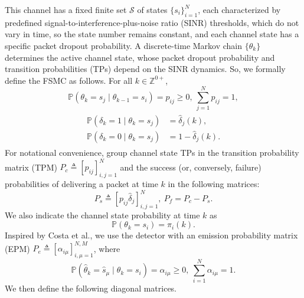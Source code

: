 \documentclass[journal,twoside,web]{ieeecolor}
\begin{document}
This channel has a fixed finite set $\mathcal{S}$ of states $\{s_i\}_{i=1}^{N}$, each characterized by predefined signal-to-interference-plus-noise ratio (SINR) thresholds, which do not vary in time, so the state number remains constant, and each channel state has a specific packet dropout probability. 
A discrete-time Markov chain $\{\theta_k\}$ determines the active channel state, whose packet dropout probability and transition probabilities (TPs) depend on the SINR dynamics. So, we formally define the FSMC as follows.
For all $k\in \mathbb{Z}^{0+}$,
\begin{equation}\label{eq:p-ij}
    \mathbb{P}(\theta_{k} = s_j \mid \theta_{k-1} = s_i) = p_{ij} \geq 0,~ \sum_{j=1}^N p_{ij} = 1,
\end{equation}
\begin{align}\label{eq:p-delta}
\begin{aligned}
    \mathbb{P}(\delta_k = 1 \mid \theta_{k} = s_j) &= \hat{\delta}_{j}(k),\\
    \mathbb{P}(\delta_k = 0 \mid \theta_{k} = s_j) &= 1 - \hat{\delta}_{j}(k).    
\end{aligned}
\end{align}
For notational convenience, group %
channel state TPs in the transition probability matrix (TPM) $P_{c}^{} \triangleq \left[p_{ij}\right]_{i,j=1}^{N}$
and the  success (or, conversely, failure) probabilities of delivering a packet at time $k$ in the following matrices:
\begin{equation}\label{eq:Ps}
    P_{s}^{} \triangleq \left[p_{ij}\hat{\delta}_{j}\right]_{i,j=1}^{N},~P_{f} = P_{c} - P_{s}.
\end{equation}
We also indicate the channel state probability at time $k$ as
\begin{equation}\label{eq:pik}
     \mathbb{P}(\theta_{k} = s_i) = \pi_{i}(k).
\end{equation}
Inspired by Costa et al., we use the detector with an emission probability matrix (EPM) $P_{e}^{} \triangleq \left[\alpha_{i\mu}\right]_{i,\mu=1}^{N,M}$, where
\begin{equation}\label{eq:alpha}
   \mathbb{P}(\hat{\theta}_{k} = \hat{s}_{\mu} \mid \theta_{k} = s_i) = \alpha_{i\mu} \geq 0,~ \sum_{i=1}^N \alpha_{i\mu}= 1.
\end{equation}
We then define the following diagonal matrices.
\end{document}
